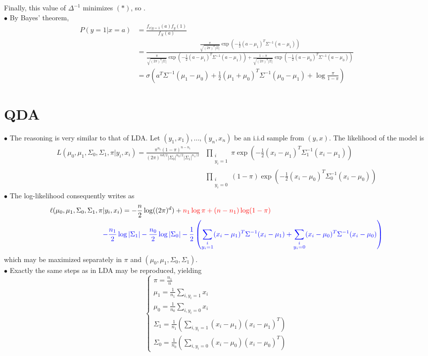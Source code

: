 \documentclass[a4paper,11pt]{article}
\begin{document}
Finally, this value of $\Delta^{-1}$ minimizes $(*)$, so .\\
\noindent $\bullet$ By Bayes' theorem, $$\begin{aligned}
  P(y=1|x=a) &= \frac{f_{x|y=1}(a)f_y(1)}{f_X(a)}\\ &= \frac{\frac{\pi}{\sqrt{(2\pi)^d |\Sigma|}}\exp\left(-\frac 12 (a-\mu_1)^T\Sigma^{-1}(a-\mu_1) \right)}{\frac{\pi}{\sqrt{(2\pi)^d |\Sigma|}}\exp\left(-\frac 12 (a-\mu_1)^T\Sigma^{-1}(a-\mu_1) \right) + \frac{1-\pi}{\sqrt{(2\pi)^d |\Sigma|}}\exp\left(-\frac 12 (a-\mu_0)^T\Sigma^{-1}(a-\mu_0) \right)}\\
  &= \sigma\left(a^T\Sigma^{-1}(\mu_1-\mu_0) + \frac12(\mu_1+\mu_0)^T\Sigma^{-1}(\mu_0-\mu_1)+\log \frac{\pi}{1-\pi}\right)
\end{aligned}$$

\section*{QDA}
$\bullet$ The reasoning is very similar to that of LDA. Let $(y_1,x_1),\ldots,(y_n,x_n)$ be an i.i.d sample from $(y,x)$. The likelihood of the model is $$\begin{aligned}
  L(\mu_0,\mu_1,\Sigma_0,\Sigma_1,\pi|y_i,x_i) = \frac{\pi^{n_1}(1-\pi)^{n-n_1}}{(2\pi)^{nd/2}|\Sigma_0|^{n_0/2}|\Sigma_1|^{n_1/2}}&\prod_{\substack{i\\y_i=1}} \pi\exp(-\frac12 (x_i-\mu_1)^T\Sigma_1^{-1}(x_i-\mu_1))\\&\prod_{\substack{i\\y_i=0}}(1-\pi)\exp(-\frac12 (x_i-\mu_0)^T\Sigma_0^{-1}(x_i-\mu_0))
\end{aligned}$$
$\bullet$ The log-likelihood consequently writes as $$
\begin{aligned}[t]\ell(\mu_0,\mu_1,\Sigma_0,\Sigma_1,\pi&|y_i,x_i) = -\frac n2 \log((2\pi)^d)+ \color{red}{n_1\log \pi +(n-n_1)\log(1-\pi)}\\ &\color{blue}{-\frac {n_1}2 \log |\Sigma_1|-\frac {n_0}2 \log |\Sigma_0|  -\frac 12 \left( \sum_{\substack{i\\y_i=1}}(x_i-\mu_1)^T\Sigma^{-1}(x_i-\mu_1) + \sum_{\substack{i\\y_i=0}}(x_i-\mu_0)^T\Sigma^{-1}(x_i-\mu_0)\right)}\end{aligned}
$$ which may be maximized separately in $\pi$ and $(\mu_0,\mu_1,\Sigma_0,\Sigma_1)$.\\
$\bullet$ Exactly the same steps as in LDA may be reproduced, yielding $$\begin{cases}
  \pi = \frac{n_1}n \\ \mu_1= \frac{1}{n_1}\sum_{i,y_i=1} x_i \\ \mu_0 = \frac{1}{n_0}\sum_{i,y_i=0} x_i\\
  \Sigma_1 = \frac 1{n_1}\left(\sum_{i,y_i=1} (x_i-\mu_1)(x_i-\mu_1)^T \right)\\ \Sigma_0 = \frac 1{n_0}\left(\sum_{i,y_i=0} (x_i-\mu_0)(x_i-\mu_0)^T \right)
\end{cases}$$
\end{document}
